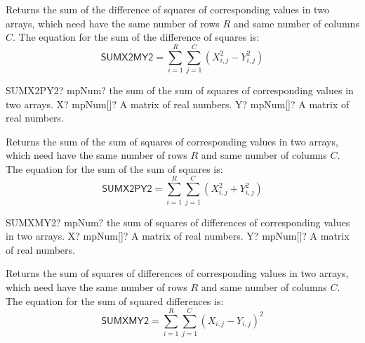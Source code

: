 \vspace{0.3cm}
Returns the sum of the difference of squares of corresponding values in two arrays, which need have the same number of rows $R$ and same number of columns $C$.
The equation for the sum of the difference of squares is: 
\begin{equation}
	\textsf{SUMX2MY2} =  \sum_{i=1}^R \sum_{j=1}^C  \left(X_{i,j}^2 - Y_{i,j}^2 \right)
\end{equation}





\begin{mpFunctionsExtract}
	\mpWorksheetFunctionTwoNotImplemented
	{SUMX2PY2? mpNum? the sum of the sum of squares of corresponding values in two arrays.}
	{X? mpNum[]? A matrix of real numbers.}
	{Y? mpNum[]? A matrix of real numbers.}
\end{mpFunctionsExtract}

\vspace{0.3cm}
Returns the sum of the sum of squares of corresponding values in two arrays, which need have the same number of rows $R$ and same number of columns $C$.
The equation for the sum of the sum of squares is: 
\begin{equation}
	\textsf{SUMX2PY2} = \sum_{i=1}^R \sum_{j=1}^C  \left(X_{i,j}^2 + Y_{i,j}^2\right)
\end{equation}




\begin{mpFunctionsExtract}
	\mpWorksheetFunctionTwoNotImplemented
	{SUMXMY2? mpNum? the sum of squares of differences of corresponding values in two arrays.}
	{X? mpNum[]? A matrix of real numbers.}
	{Y? mpNum[]? A matrix of real numbers.}
\end{mpFunctionsExtract}

\vspace{0.3cm}
Returns  the sum of squares of differences of corresponding values in two arrays, which need have the same number of rows $R$ and same number of columns $C$.
The equation for the sum of squared differences is: 
\begin{equation}
	\textsf{SUMXMY2} =  \sum_{i=1}^R \sum_{j=1}^C  \left(X_{i,j} - Y_{i,j}\right)^2
\end{equation}








